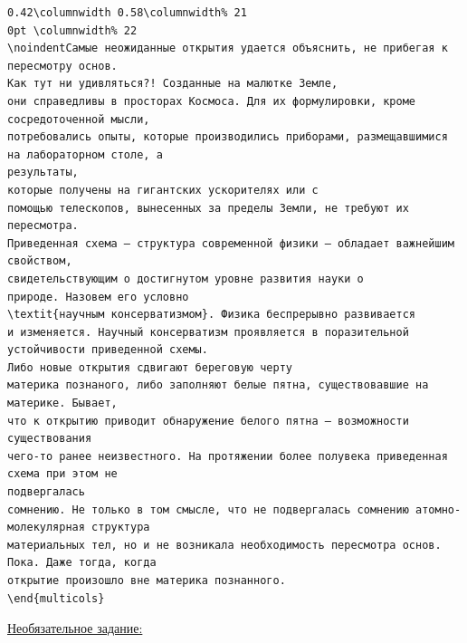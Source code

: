 \documentclass[a4paper,10pt]{article}
\begin{document}
\begin{verbatim}
0.42\columnwidth 0.58\columnwidth% 21
0pt \columnwidth% 22
\noindentСамые неожиданные открытия удается объяснить, не прибегая к пересмотру основ.
Как тут ни удивляться?! Созданные на малютке Земле,
они справедливы в просторах Космоса. Для их формулировки, кроме сосредоточенной мысли,
потребовались опыты, которые производились приборами, размещавшимися на лабораторном столе, а
результаты,
которые получены на гигантских ускорителях или с
помощью телескопов, вынесенных за пределы Земли, не требуют их пересмотра.
Приведенная схема – структура современной физики – обладает важнейшим свойством,
свидетельствующим о достигнутом уровне развития науки о
природе. Назовем его условно
\textit{научным консерватизмом}. Физика беспрерывно развивается
и изменяется. Научный консерватизм проявляется в поразительной устойчивости приведенной схемы.
Либо новые открытия сдвигают береговую черту
материка познаного, либо заполняют белые пятна, существовавшие на материке. Бывает,
что к открытию приводит обнаружение белого пятна – возможности существования
чего-то ранее неизвестного. На протяжении более полувека приведенная схема при этом не
подвергалась
сомнению. Не только в том смысле, что не подвергалась сомнению атомно-молекулярная структура
материальных тел, но и не возникала необходимость пересмотра основ. Пока. Даже тогда, когда
открытие произошло вне материка познанного.
\end{multicols}
\end{verbatim}

\fontsize{14pt}{14pt}\selectfont
\noindent\underline{Необязательное задание:}
\end{document}
